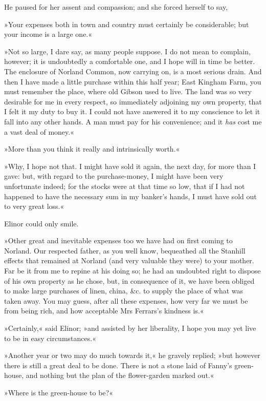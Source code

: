 He paused for her assent and compassion; and she forced herself to say,

»Your expenses both in town and country must certainly be considerable; but your income is a large one.«

»Not so large, I dare say, as many people suppose. I do not mean to complain, however; it is undoubtedly a comfortable one, and I hope will in time be better. The enclosure of Norland Common, now carrying on, is a most serious drain. And then I have made a little purchase within this half year; East Kingham Farm, you must remember the place, where old Gibson used to live. The land was so very desirable for me in every respect, so immediately adjoining my own property, that I felt it my duty to buy it. I could not have answered it to my conscience to let it fall into any other hands. A man must pay for his convenience; and it \textit{has} cost me a vast deal of money.«

»More than you think it really and intrinsically worth.«

»Why, I hope not that. I might have sold it again, the next day, for more than I gave: but, with regard to the purchase-money, I might have been very unfortunate indeed; for the stocks were at that time so low, that if I had not happened to have the necessary sum in my banker’s hands, I must have sold out to very great loss.«

Elinor could only smile.

»Other great and inevitable expenses too we have had on first coming to Norland. Our respected father, as you well know, bequeathed all the Stanhill effects that remained at Norland (and very valuable they were) to your mother. Far be it from me to repine at his doing so; he had an undoubted right to dispose of his own property as he chose, but, in consequence of it, we have been obliged to make large purchases of linen, china, \&c. to supply the place of what was taken away. You may guess, after all these expenses, how very far we must be from being rich, and how acceptable Mrs Ferrars’s kindness is.«

»Certainly,« said Elinor; »and assisted by her liberality, I hope you may yet live to be in easy circumstances.«

»Another year or two may do much towards it,« he gravely replied; »but however there is still a great deal to be done. There is not a stone laid of Fanny’s green-house, and nothing but the plan of the flower-garden marked out.«

»Where is the green-house to be?«

